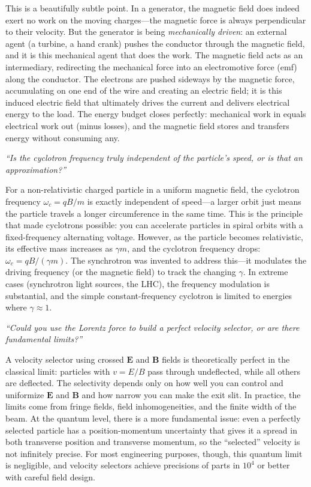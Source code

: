 \documentclass[11pt,openright]{book}
\begin{document}
This is a beautifully subtle point. In a generator, the magnetic field does indeed exert no work on the moving charges---the magnetic force is always perpendicular to their velocity. But the generator is being \emph{mechanically driven}: an external agent (a turbine, a hand crank) pushes the conductor through the magnetic field, and it is this mechanical agent that does the work. The magnetic field acts as an intermediary, redirecting the mechanical force into an electromotive force (emf) along the conductor. The electrons are pushed sideways by the magnetic force, accumulating on one end of the wire and creating an electric field; it is this induced electric field that ultimately drives the current and delivers electrical energy to the load. The energy budget closes perfectly: mechanical work in equals electrical work out (minus losses), and the magnetic field stores and transfers energy without consuming any.

\textit{``Is the cyclotron frequency truly independent of the particle's speed, or is that an approximation?''}

For a non-relativistic charged particle in a uniform magnetic field, the cyclotron frequency $\omega_c = qB/m$ is exactly independent of speed---a larger orbit just means the particle travels a longer circumference in the same time. This is the principle that made cyclotrons possible: you can accelerate particles in spiral orbits with a fixed-frequency alternating voltage. However, as the particle becomes relativistic, its effective mass increases as $\gamma m$, and the cyclotron frequency drops: $\omega_c = qB/(\gamma m)$. The synchrotron was invented to address this---it modulates the driving frequency (or the magnetic field) to track the changing $\gamma$. In extreme cases (synchrotron light sources, the LHC), the frequency modulation is substantial, and the simple constant-frequency cyclotron is limited to energies where $\gamma \approx 1$.

\textit{``Could you use the Lorentz force to build a perfect velocity selector, or are there fundamental limits?''}

A velocity selector using crossed $\mathbf{E}$ and $\mathbf{B}$ fields is theoretically perfect in the classical limit: particles with $v = E/B$ pass through undeflected, while all others are deflected. The selectivity depends only on how well you can control and uniformize $\mathbf{E}$ and $\mathbf{B}$ and how narrow you can make the exit slit. In practice, the limits come from fringe fields, field inhomogeneities, and the finite width of the beam. At the quantum level, there is a more fundamental issue: even a perfectly selected particle has a position-momentum uncertainty that gives it a spread in both transverse position and transverse momentum, so the ``selected'' velocity is not infinitely precise. For most engineering purposes, though, this quantum limit is negligible, and velocity selectors achieve precisions of parts in $10^4$ or better with careful field design.
\end{document}
